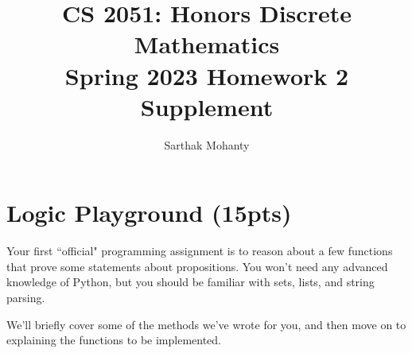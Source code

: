 \documentclass{article}
\title{\vspace{-1cm}CS 2051: Honors Discrete Mathematics \\Spring 2023 Homework 2 Supplement}
\author{Sarthak Mohanty}
\date{}
\begin{document}
\maketitle

\section*{Logic Playground (15pts)}

    Your first ``official" programming assignment is to reason about a few functions that prove some statements about propositions. You won't need any advanced knowledge of Python, but you should be familiar with sets, lists, and string parsing.

    \vspace{3mm}
    We'll briefly cover some of the methods we've wrote for you, and then move on to explaining the functions to be implemented.
\end{document}
